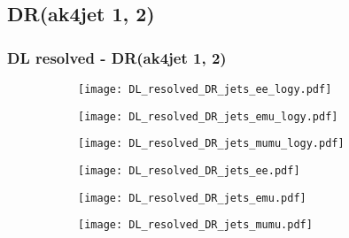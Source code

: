 \documentclass[aspectratio=169,8pt]{beamer}
\begin{document}
\subsection{DR(ak4jet 1, 2)}
\begin{frame}
\frametitle{DL resolved - DR(ak4jet 1, 2)}
\begin{figure}
\captionsetup[subfigure]{labelformat=empty}
\begin{subfigure}{0.32\textwidth}
\texttt{[image: DL\_resolved\_DR\_jets\_ee\_logy.pdf]}
\vspace*{-0.15cm}
\end{subfigure}
\hfil
\begin{subfigure}{0.32\textwidth}
\texttt{[image: DL\_resolved\_DR\_jets\_emu\_logy.pdf]}
\vspace*{-0.15cm}
\end{subfigure}
\hfil
\begin{subfigure}{0.32\textwidth}
\texttt{[image: DL\_resolved\_DR\_jets\_mumu\_logy.pdf]}
\vspace*{-0.15cm}
\end{subfigure}
\hfil
\begin{subfigure}{0.32\textwidth}
\texttt{[image: DL\_resolved\_DR\_jets\_ee.pdf]}
\vspace*{-0.15cm}
\end{subfigure}
\hfil
\begin{subfigure}{0.32\textwidth}
\texttt{[image: DL\_resolved\_DR\_jets\_emu.pdf]}
\vspace*{-0.15cm}
\end{subfigure}
\hfil
\begin{subfigure}{0.32\textwidth}
\texttt{[image: DL\_resolved\_DR\_jets\_mumu.pdf]}
\vspace*{-0.15cm}
\end{subfigure}
\hfil
\end{figure}
\end{frame}
\newpage
\end{document}
